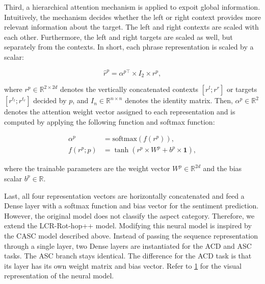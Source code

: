 \documentclass[american, oneside]{ecsgdp}
\begin{document}
Third, a hierarchical attention mechanism is applied to expoit global information. Intuitively, the mechanism decides whether the left or right context provides more relevant information about the target. The left and right contexts are scaled with each other. Furthermore, the left and right targets are scaled as well, but separately from the contexts. In short, each phrase representation is scaled by a scalar:

\begin{equation}
    \hat{r}^p = \alpha^{p\top} \times I_2 \times  r^p , \label{eq:hier_att}
\end{equation}

\noindent where $r^p \in \mathbb{R}^{2 \times 2d}$ denotes the vertically concatenated contexts $[r^l; r^r]$ or targets $[r^{t_l}; r^{t_r}]$ decided by $p$, and $I_n \in \mathbb{R}^{n \times n}$ denotes the identity matrix. Then, $\alpha^p \in \mathbb{R}^2$ denotes the attention weight vector assigned to each representation and is computed by applying the following function and softmax function:

\begin{align}
    \alpha^p                         & = \text{softmax}\left( f \left( r^p\right) \right), \label{eq:hier_alpha}\\
    f \left( r^p; p \right) & = \tanh{\left( r^{p} \times W^p + b^p \times \mathbf{1} \right)}, \label{eq:hier_tanh}
\end{align}

\noindent where the trainable parameters are the weight vector $W^p \in \mathbb{R}^{2d}$ and the bias scalar $b^p \in \mathbb{R}$. 

Last, all four representation vectors are horizontally concatenated and feed a Dense layer with a softmax function and bias vector for the sentiment prediction. However, the original model does not classify the aspect category. Therefore, we extend the LCR-Rot-hop++ model. Modifying this neural model is inspired by the CASC model described above. Instead of passing the sequence representation through a single layer, two Dense layers are instantiated for the ACD and ASC tasks. The ASC branch stays identical. The difference for the ACD task is that its layer has its own weight matrix and bias vector. Refer to \cref{fig:CASC+LCR} for the visual representation of the neural model.

\begin{figure}[htbp]
  \centering
  
  \caption{}
  \label{fig:CASC+LCR}
\end{figure}
\end{document}
